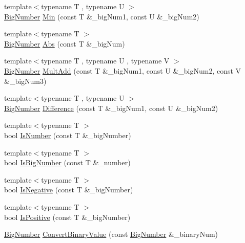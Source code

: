 \begin{DoxyCompactItemize}
\item 
{\footnotesize template$<$typename T , typename U $>$ }\\\mbox{\hyperlink{class_big_nums_1_1_big_number}{Big\+Number}} \mbox{\hyperlink{namespace_big_nums_a75b2a2bd89326e34387f3465ea9735b7}{Min}} (const T \&\+\_\+big\+Num1, const U \&\+\_\+big\+Num2)
\item 
{\footnotesize template$<$typename T $>$ }\\\mbox{\hyperlink{class_big_nums_1_1_big_number}{Big\+Number}} \mbox{\hyperlink{namespace_big_nums_a18e6e5d50d69125d22b2d4510354de2e}{Abs}} (const T \&\+\_\+big\+Num)
\item 
{\footnotesize template$<$typename T , typename U , typename V $>$ }\\\mbox{\hyperlink{class_big_nums_1_1_big_number}{Big\+Number}} \mbox{\hyperlink{namespace_big_nums_a673780802e05413ca959d9ef903a0b0c}{Mult\+Add}} (const T \&\+\_\+big\+Num1, const U \&\+\_\+big\+Num2, const V \&\+\_\+big\+Num3)
\item 
{\footnotesize template$<$typename T , typename U $>$ }\\\mbox{\hyperlink{class_big_nums_1_1_big_number}{Big\+Number}} \mbox{\hyperlink{namespace_big_nums_a60e4463715275849b533433223e2ee07}{Difference}} (const T \&\+\_\+big\+Num1, const U \&\+\_\+big\+Num2)
\item 
{\footnotesize template$<$typename T $>$ }\\bool \mbox{\hyperlink{namespace_big_nums_a3353e9045574582f6c7b5f243f700716}{Is\+Number}} (const T \&\+\_\+big\+Number)
\item 
{\footnotesize template$<$typename T $>$ }\\bool \mbox{\hyperlink{namespace_big_nums_a66d44277d6d6e0ff43c9e00ee79e0c86}{Is\+Big\+Number}} (const T \&\+\_\+number)
\item 
{\footnotesize template$<$typename T $>$ }\\bool \mbox{\hyperlink{namespace_big_nums_aea836101e2c13e62da1ac27d7b6c77d8}{Is\+Negative}} (const T \&\+\_\+big\+Number)
\item 
{\footnotesize template$<$typename T $>$ }\\bool \mbox{\hyperlink{namespace_big_nums_ad10e532cfb62a71e7c6b68f5941362d5}{Is\+Positive}} (const T \&\+\_\+big\+Number)
\item 
\mbox{\hyperlink{class_big_nums_1_1_big_number}{Big\+Number}} \mbox{\hyperlink{namespace_big_nums_ad3c1a55de2f548036c5f3888c2b4061d}{Convert\+Binary\+Value}} (const \mbox{\hyperlink{class_big_nums_1_1_big_number}{Big\+Number}} \&\+\_\+binary\+Num)

\end{DoxyCompactItemize}

